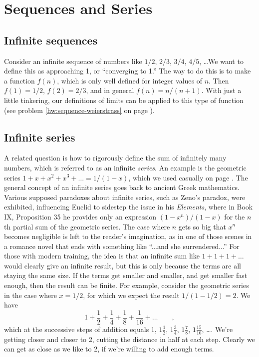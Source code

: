 \chapter{Sequences and Series}

\section{Infinite sequences}

Consider an infinite sequence of numbers like $1/2$, $2/3$, $3/4$, $4/5$, \ldots We want to define
this as approaching 1, or ``converging to 1.'' The way to do this is to make a function $f(n)$, which is only
well defined for integer values of $n$. Then $f(1)=1/2$, $f(2)=2/3$, and in general
$f(n)=n/(n+1)$. With just a little tinkering, our definitions of limits can be
applied to this type of function  (see problem \ref{hw:sequence-weierstrass} on page \pageref{hw:sequence-weierstrass}).

\section{Infinite series}
A related question is how to rigorously define the sum of infinitely many numbers, which is referred to
as an infinite \emph{series}. An example is the geometric series
$1+x+x^2+x^3+\ldots=1/(1-x)$,
which we used casually on page \pageref{geometric-series}.
The general concept of an infinite series goes back
to ancient Greek mathematics. Various supposed paradoxes about infinite series, such as Zeno's paradox,
were exhibited, influencing Euclid to sidestep the issue in his \emph{Elements}, where in Book IX, Proposition 35
he provides only an expression $(1-x^n)/(1-x)$ for the $n$th partial sum of the geometric series.
The case where $n$ gets so big that $x^n$ becomes negligible is left to the reader's imagination,
as in one of those scenes in a romance novel that ends with something like ``...and she surrendered...''
For those with modern training, the idea is that an infinite sum like $1+1+1+\ldots$ would
clearly give an infinite result, but this is only because the terms are all staying the same size. If the terms get
smaller and smaller, and get smaller fast enough, then the result can be finite. For example, consider the geometric
series in the case where $x=1/2$, for which we expect the result $1/(1-1/2)=2$. We have
\begin{equation*}
  1 + \frac{1}{2} + \frac{1}{4} + \frac{1}{8} + \frac{1}{16} + \ldots \qquad ,
\end{equation*}
which at the successive steps of addition equals 1, $1\frac{1}{2}$, $1\frac{3}{4}$, $1\frac{7}{8}$,  $1\frac{15}{16}$, \ldots.
We're getting closer and closer to 2, cutting the distance in half at each step. Clearly we can get as close as we like to 2,
if we're willing to add enough terms.

